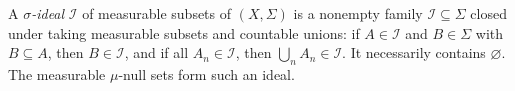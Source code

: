 
A \emph{$\sigma$-ideal} $\mathcal I$ of measurable subsets of $(X,\Sigma)$ is a nonempty family $\mathcal I\subseteq\Sigma$ closed under taking measurable subsets and countable unions: if $A\in\mathcal I$ and $B\in\Sigma$ with $B\subseteq A$, then $B\in\mathcal I$, and if all $A_n\in\mathcal I$, then $\bigcup_nA_n\in\mathcal I$. It necessarily contains $\varnothing$. The measurable $\mu$-null sets form such an ideal.
